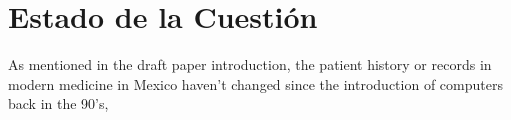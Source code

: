 \section{Estado de la Cuestión}
As mentioned in the draft paper introduction, the patient history or records in modern medicine in Mexico haven't changed since the introduction of computers back in the 90's,